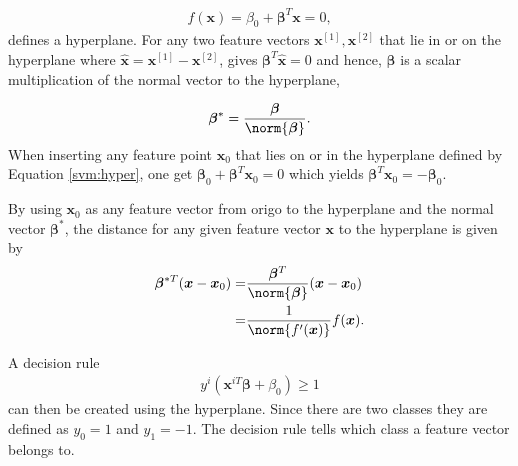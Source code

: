             \begin{align}
                f(\bm x) = \beta_0 + \bm \beta^T\bm x = 0,
                \label{svm:hyper}
            \end{align}
            defines a hyperplane. For any two feature vectors $\bm x^{[1]},\bm x^{[2]}$ that lie in or on the hyperplane where $\bm \hat x = \bm x^{[1]} - \bm x^{[2]}$, gives  $\bm \beta^T \bm \hat x = 0 $ and hence, $\bm \beta$ is a scalar multiplication of the normal vector to the hyperplane, 
            
            \begin{align}
                \bm \beta^* = \frac{\bm \beta}{\norm{\bm \beta}}.
                \label{svm:norm}
            \end{align}
            When inserting any feature point $\bm x_0$ that lies on or in the hyperplane defined by Equation \ref{svm:hyper}, one get $\bm \beta_0 + \bm \beta^T\bm x_0 = 0$ which yields $\bm \beta^T\bm x_0 = -\bm \beta_0$. 
            
            By using $\bm x_0$ as any feature vector from origo to the hyperplane and the normal vector $\bm \beta^*$, the distance for any given feature vector $\bm x$ to the hyperplane is given by
            \begin{align}
                \bm \beta^{*T}(\bm x - \bm x_0) = & \frac{\bm \beta^T}{\norm{\bm \beta}} (\bm x - \bm x_0) \nonumber \\
                = & \frac{1}{\norm{f'(\bm x)}}f(\bm x).
                \label{svm:dist}
            \end{align}
            
            A decision rule 
            \begin{align}
                y^i(\bm x^{iT} \bm \beta + \beta_0) \geq 1 
                \label{svm:decision}
            \end{align}
            can then be created using the hyperplane. Since there are two classes they are defined as $y_0 = 1$ and $y_1 = -1$. The decision rule tells which class a feature vector belongs to.
            
